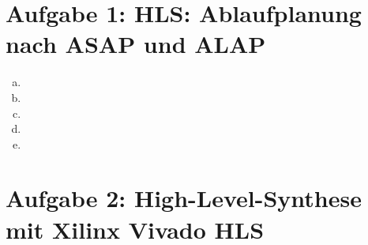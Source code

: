 \documentclass[a4paper]{scrartcl}
\begin{document}
	
\section*{Aufgabe 1: HLS: Ablaufplanung nach ASAP und ALAP}

\begin{enumerate}[(a)]
	\item
	\item
	\item
	\item
	\item
\end{enumerate}

\section*{Aufgabe 2: High-Level-Synthese mit Xilinx Vivado HLS}
\end{document}
